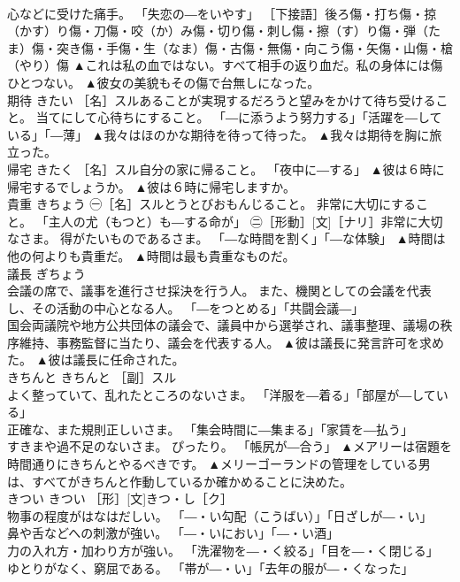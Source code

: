 \documentclass[8pt]{extreport}
\begin{document}
\begin{CJK}{UTF8}{min}
\\	心などに受けた痛手。 「失恋の―をいやす」 ［下接語］後ろ傷・打ち傷・掠（かす）り傷・刀傷・咬（か）み傷・切り傷・刺し傷・擦（す）り傷・弾（たま）傷・突き傷・手傷・生（なま）傷・古傷・無傷・向こう傷・矢傷・山傷・槍（やり）傷	▲これは私の血ではない。すべて相手の返り血だ。私の身体には傷ひとつない。 ▲彼女の美貌もその傷で台無しになった。
\\	期待	きたい	［名］スルあることが実現するだろうと望みをかけて待ち受けること。 当てにして心待ちにすること。 「―に添うよう努力する」「活躍を―している」「―薄」	▲我々はほのかな期待を待って待った。 ▲我々は期待を胸に旅立った。
\\	帰宅	きたく	［名］スル自分の家に帰ること。 「夜中に―する」	▲彼は６時に帰宅するでしょうか。 ▲彼は６時に帰宅しますか。
\\	貴重	きちょう	㊀［名］スルとうとびおもんじること。 非常に大切にすること。 「主人の尤（もつと）も―する命が」 ㊁［形動］[文]［ナリ］非常に大切なさま。 得がたいものであるさま。 「―な時間を割く」「―な体験」	▲時間は他の何よりも貴重だ。 ▲時間は最も貴重なものだ。
\\	議長	ぎちょう	
\\	会議の席で、議事を進行させ採決を行う人。 また、機関としての会議を代表し、その活動の中心となる人。 「―をつとめる」「共闘会議―」 
\\	国会両議院や地方公共団体の議会で、議員中から選挙され、議事整理、議場の秩序維持、事務監督に当たり、議会を代表する人。	▲彼は議長に発言許可を求めた。 ▲彼は議長に任命された。
\\	きちんと	きちんと	［副］スル 
\\	よく整っていて、乱れたところのないさま。 「洋服を―着る」「部屋が―している」 
\\	正確な、また規則正しいさま。 「集会時間に―集まる」「家賃を―払う」 
\\	すきまや過不足のないさま。 ぴったり。 「帳尻が―合う」	▲メアリーは宿題を時間通りにきちんとやるべきです。 ▲メリーゴーランドの管理をしている男は、すべてがきちんと作動しているか確かめることに決めた。
\\	きつい	きつい	［形］[文]きつ・し［ク］ 
\\	物事の程度がはなはだしい。 「―・い勾配（こうばい）」「日ざしが―・い」 
\\	鼻や舌などへの刺激が強い。 「―・いにおい」「―・い酒」 
\\	力の入れ方・加わり方が強い。 「洗濯物を―・く絞る」「目を―・く閉じる」 
\\	ゆとりがなく、窮屈である。 「帯が―・い」「去年の服が―・くなった」 

\end{CJK}
\end{document}
